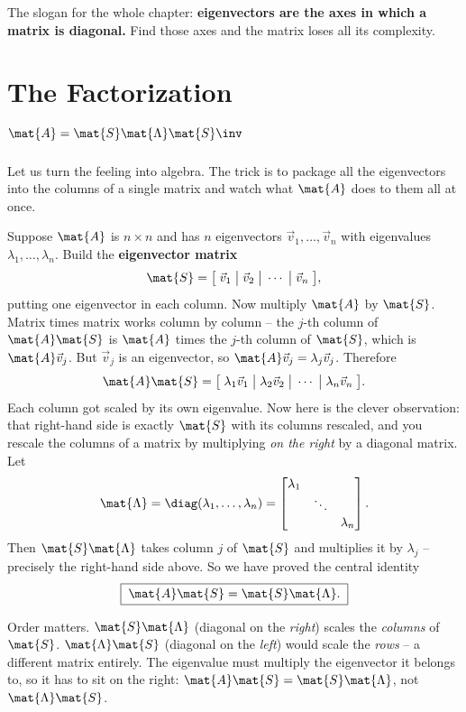 \begin{focusbox}
The slogan for the whole chapter: \textbf{eigenvectors are the axes in which a
matrix is diagonal.} Find those axes and the matrix loses all its complexity.
\end{focusbox}

\section{The Factorization \texorpdfstring{$\mat{A}=\mat{S}\mat{\Lambda}\mat{S}\inv$}{A = S Lambda S inverse}}
\label{ch24:factorization}

Let us turn the feeling into algebra. The trick is to package all the
eigenvectors into the columns of a single matrix and watch what
$\mat{A}$ does to them all at once.

Suppose $\mat{A}$ is $n\times n$ and has $n$ eigenvectors
$\vec{v}_1, \dots, \vec{v}_n$ with eigenvalues $\lambda_1, \dots, \lambda_n$.
Build the \textbf{eigenvector matrix}
\[
  \mat{S} = \big[\; \vec{v}_1 \;\big|\; \vec{v}_2 \;\big|\; \cdots \;\big|\; \vec{v}_n \;\big],
\]
putting one eigenvector in each column. Now multiply $\mat{A}$ by $\mat{S}$.
Matrix times matrix works column by column -- the $j$-th column of $\mat{A}\mat{S}$
is $\mat{A}$ times the $j$-th column of $\mat{S}$, which is $\mat{A}\vec{v}_j$.
But $\vec{v}_j$ is an eigenvector, so $\mat{A}\vec{v}_j = \lambda_j\vec{v}_j$.
Therefore
\[
  \mat{A}\mat{S}
  = \big[\; \lambda_1\vec{v}_1 \;\big|\; \lambda_2\vec{v}_2 \;\big|\; \cdots \;\big|\; \lambda_n\vec{v}_n \;\big].
\]
Each column got scaled by its own eigenvalue. Now here is the clever observation:
that right-hand side is exactly $\mat{S}$ with its columns rescaled, and you
rescale the columns of a matrix by multiplying \emph{on the right} by a diagonal
matrix. Let
\[
  \mat{\Lambda} = \diag(\lambda_1, \dots, \lambda_n)
  = \begin{bmatrix} \lambda_1 & & \\ & \ddots & \\ & & \lambda_n \end{bmatrix}.
\]
Then $\mat{S}\mat{\Lambda}$ takes column $j$ of $\mat{S}$ and multiplies it by
$\lambda_j$ -- precisely the right-hand side above. So we have proved the central
identity
\[
  \boxed{\;\mat{A}\mat{S} = \mat{S}\mat{\Lambda}.\;}
\]

\begin{trapbox}
Order matters. $\mat{S}\mat{\Lambda}$ (diagonal on the \emph{right}) scales the
\emph{columns} of $\mat{S}$. $\mat{\Lambda}\mat{S}$ (diagonal on the
\emph{left}) would scale the \emph{rows} -- a different matrix entirely. The
eigenvalue must multiply the eigenvector it belongs to, so it has to sit on the
right: $\mat{A}\mat{S} = \mat{S}\mat{\Lambda}$, not $\mat{\Lambda}\mat{S}$.
\end{trapbox}

